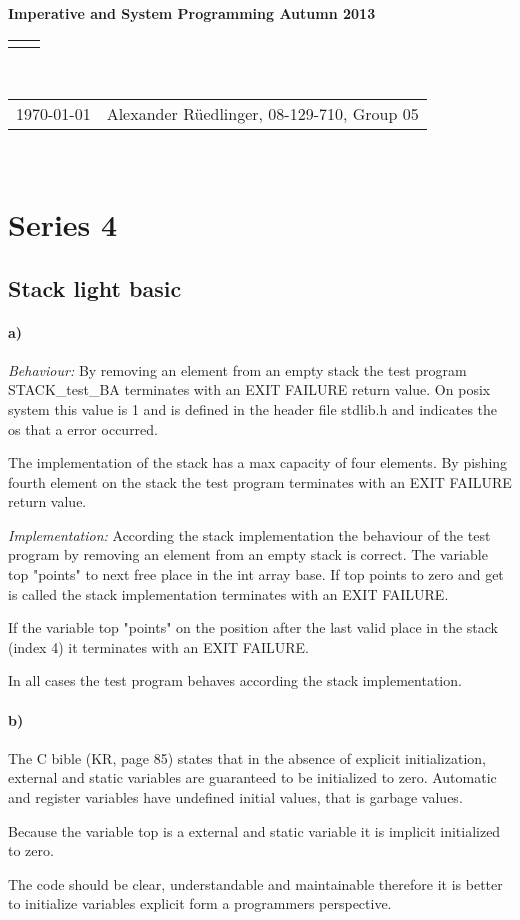 \documentclass[12pt]{article}
\renewcommand{\title}[1]{\textbf{#1}\\}
\renewcommand{\line}{\begin{tabularx}{\textwidth}{X>{\raggedleft}X}\hline\\\end{tabularx}\\[-0.5cm]}
\newcommand{\leftright}[2]{\begin{tabularx}{\textwidth}{X>{\raggedleft}X}#1%
& #2\\\end{tabularx}\\[-0.5cm]}
\begin{document}
\title{Imperative and System Programming Autumn 2013}
\line
\leftright{\today}{Alexander Rüedlinger, 08-129-710, Group 05} %
\section*{Series 4}
\subsection*{Stack light basic}
\paragraph{a)} 
\emph{Behaviour:}
By removing an element from an empty stack the test program STACK\_test\_BA terminates with an EXIT FAILURE return value. On posix system this value is 1 and is defined in the header file stdlib.h and indicates the os that a error occurred.

The implementation of the stack has a max capacity of four elements. By pishing fourth element on the stack the test program terminates with an EXIT FAILURE return value.

\emph{Implementation:}
According the stack implementation the behaviour of the test program by removing an element from an empty stack is correct. The variable top "points" to next free place in the int array base. If top points to zero and get is called the stack implementation terminates with an EXIT FAILURE.

If the variable top "points" on the position after the last valid place in the stack (index 4) it terminates with an EXIT FAILURE.

In all cases the test program behaves according the stack implementation.

\paragraph{b)}
The C bible (KR, page 85) states that in the absence of explicit initialization, external and static variables are guaranteed to be initialized to zero. Automatic and register variables have undefined initial values, that is garbage values.

Because the variable top is a external and static variable it is implicit initialized to zero.

The code should be clear, understandable and maintainable therefore it is better to initialize variables explicit form a programmers perspective.
\end{document}
